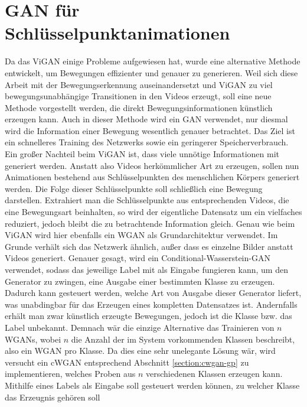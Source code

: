 \section{GAN für Schlüsselpunktanimationen}
Da das ViGAN einige Probleme aufgewiesen hat, wurde eine alternative Methode
entwickelt, um Bewegungen effizienter und genauer zu generieren. Weil sich diese
Arbeit mit der Bewegungserkennung auseinandersetzt und ViGAN zu viel
bewegungsunabhängige Transitionen in den Videos erzeugt, soll eine neue Methode
vorgestellt werden, die direkt Bewegungsinformationen künstlich erzeugen kann.
Auch in dieser Methode wird ein GAN verwendet, nur diesmal wird die Information
einer Bewegung wesentlich genauer betrachtet. Das Ziel ist ein schnelleres
Training des Netzwerks sowie ein geringerer Speicherverbrauch. Ein großer
Nachteil beim ViGAN ist, dass viele unnötige Informationen mit generiert werden.
Anstatt also Videos herkömmlicher Art zu erzeugen, sollen nun Animationen
bestehend aus Schlüsselpunkten des menschlichen Körpers generiert werden. Die
Folge dieser Schlüsselpunkte soll schließlich eine Bewegung darstellen.
Extrahiert man die Schlüsselpunkte aus entsprechenden Videos, die eine
Bewegungsart beinhalten, so wird der eigentliche Datensatz um ein vielfaches
reduziert, jedoch bleibt die zu betrachtende Information gleich. Genau
wie beim ViGAN wird hier ebenfalls ein WGAN als Grundarchitektur verwendet. Im
Grunde verhält sich das Netzwerk ähnlich, außer dass es einzelne
Bilder anstatt Videos generiert. Genauer gesagt, wird ein
Conditional-Wasserstein-GAN verwendet, sodass das jeweilige Label mit als
Eingabe fungieren kann, um den Generator zu zwingen, eine Ausgabe einer
bestimmten Klasse zu erzeugen. Dadurch kann gesteuert werden, welche Art von
Ausgabe dieser Generator liefert, was unabdingbar für das Erzeugen eines
kompletten Datensatzes ist. Andernfalls erhält man zwar künstlich erzeugte
Bewegungen, jedoch ist die Klasse bzw. das Label unbekannt. Demnach wär die
einzige Alternative das Trainieren von $n$ WGANs, wobei $n$ die Anzahl der im
System vorkommenden Klassen beschreibt, also ein WGAN pro Klasse. Da dies eine
sehr unelegante Lösung wär, wird versucht ein cWGAN entsprechend Abschnitt
\ref{section:cwgan-gp} zu implementieren, welches Proben aus $n$ verschiedenen
Klassen erzeugen kann. Mithilfe eines Labels als Eingabe soll gesteuert werden
können, zu welcher Klasse das Erzeugnis gehören soll

